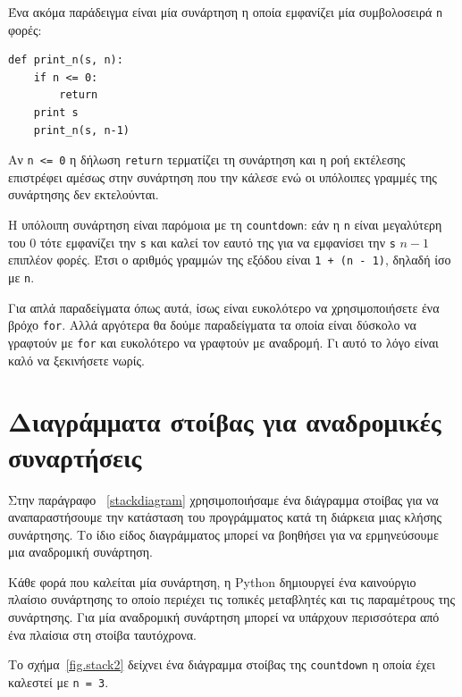 \documentclass[10pt]{book}
\begin{document}
Ένα ακόμα παράδειγμα είναι μία συνάρτηση η οποία εμφανίζει μία συμβολοσειρά 
{\tt n} φορές:


\begin{verbatim}
def print_n(s, n):
    if n <= 0:
        return
    print s
    print_n(s, n-1)
\end{verbatim}
%

Αν {\tt n <= 0} η δήλωση {\tt return} τερματίζει τη συνάρτηση και η ροή εκτέλεσης επιστρέφει αμέσως στην συνάρτηση που την κάλεσε ενώ οι υπόλοιπες γραμμές της συνάρτησης δεν εκτελούνται.

Η υπόλοιπη συνάρτηση είναι παρόμοια με τη {\tt countdown}: 
εάν η {\tt n} είναι μεγαλύτερη του 0 τότε εμφανίζει την {\tt s} και καλεί τον
εαυτό της για να εμφανίσει την {\tt s} $n-1$ επιπλέον φορές. Έτσι ο αριθμός γραμμών της εξόδου είναι {\tt 1 + (n - 1)}, δηλαδή ίσο με {\tt n}.

Για απλά παραδείγματα όπως αυτά, ίσως είναι ευκολότερο να χρησιμοποιήσετε ένα βρόχο {\tt for}. Αλλά αργότερα θα δούμε παραδείγματα τα οποία είναι δύσκολο να γραφτούν με {\tt for} και ευκολότερο να γραφτούν με αναδρομή. Γι αυτό το λόγο είναι καλό να ξεκινήσετε νωρίς.



\section{Διαγράμματα στοίβας για αναδρομικές συναρτήσεις}
\label{recursive.stack}

Στην παράγραφο ~\ref{stackdiagram} χρησιμοποιήσαμε ένα διάγραμμα στοίβας για να
αναπαραστήσουμε την κατάσταση του προγράμματος κατά τη διάρκεια μιας κλήσης συνάρτησης. Το ίδιο είδος διαγράμματος μπορεί να βοηθήσει για να ερμηνεύσουμε μια αναδρομική συνάρτηση.

Κάθε φορά που καλείται μία συνάρτηση, η Python δημιουργεί ένα καινούργιο πλαίσιο συνάρτησης το οποίο περιέχει τις τοπικές μεταβλητές και τις παραμέτρους της συνάρτησης. Για μία αναδρομική συνάρτηση μπορεί να υπάρχουν περισσότερα από ένα πλαίσια στη στοίβα ταυτόχρονα.

Το σχήμα~\ref{fig.stack2} δείχνει ένα διάγραμμα στοίβας της {\tt countdown} η οποία έχει καλεστεί με {\tt n = 3}.
\end{document}
